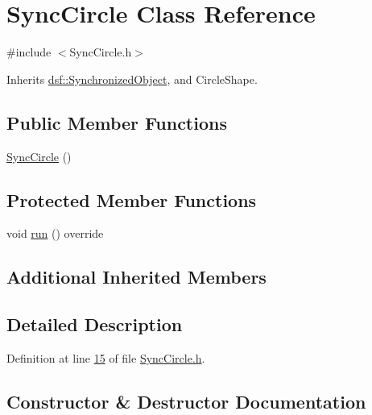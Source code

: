 \hypertarget{class_sync_circle}{}\section{Sync\+Circle Class Reference}
\label{class_sync_circle}


{\ttfamily \#include $<$Sync\+Circle.\+h$>$}



Inherits \hyperlink{classdsf_1_1_synchronized_object}{dsf\+::\+Synchronized\+Object}, and Circle\+Shape.

\subsection*{Public Member Functions}
\begin{DoxyCompactItemize}
\item 
\hyperlink{class_sync_circle_ac4137a95bfb88c1014059c57ceb92d2c}{Sync\+Circle} ()
\end{DoxyCompactItemize}
\subsection*{Protected Member Functions}
\begin{DoxyCompactItemize}
\item 
void \hyperlink{class_sync_circle_aa3087260d193fe4fee75b2adcfb986a3}{run} () override
\end{DoxyCompactItemize}
\subsection*{Additional Inherited Members}


\subsection{Detailed Description}


Definition at line \hyperlink{_sync_circle_8h_source_l00015}{15} of file \hyperlink{_sync_circle_8h_source}{Sync\+Circle.\+h}.



\subsection{Constructor \& Destructor Documentation}
\hypertarget{class_sync_circle_ac4137a95bfb88c1014059c57ceb92d2c}{}
